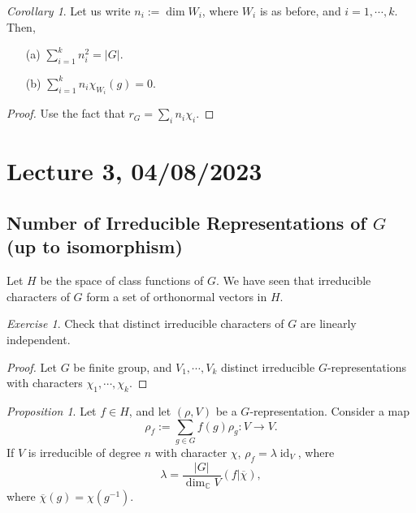 \documentclass[a4paper]{report}
\theoremstyle{definition}
\theoremstyle{remark}
\theoremstyle{proposition}
\newtheorem{proposition}{Proposition}
\theoremstyle{conjecture}
\theoremstyle{lemma}
\theoremstyle{corollary}
\newtheorem{corollary}{Corollary}
\theoremstyle{exercise}
\newtheorem{exercise}{Exercise}
\theoremstyle{example}
\newcommand{\C}{\mathbb{C}}
\newcommand{\on}{\operatorname}
\begin{document}
\begin{corollary}
    Let us write $n_i:= \dim W_i$, where $W_i$ is as before, and 
    $i=1,\cdots, k$. Then, 
    \begin{itemize}
        \item[(a)] $\sum_{i=1}^k n_i^2 = \vert G \vert$.
        \item[(b)] $\sum_{i=1}^k n_i\chi_{W_i}(g) = 0$.
    \end{itemize}
\end{corollary}
\begin{proof}
    Use the fact that $r_G = \sum_i n_i\chi_i$. 
\end{proof}

\section{Lecture 3, 04/08/2023}

\subsection{Number of Irreducible Representations of $G$ (up to isomorphism)}

Let $H$ be the space of class functions of $G$. We have seen that irreducible
characters of $G$ form a set of orthonormal vectors in $H$.

\begin{exercise}
    Check that distinct irreducible characters of $G$ are linearly 
    independent.
\end{exercise}

\begin{proof}
    Let $G$ be finite group, and $V_1,\cdots, V_k$ distinct irreducible 
    $G$-representations with characters $\chi_1,\cdots,\chi_k$.
\end{proof}

\begin{proposition}\label{prop3}
    Let $f\in H$, and let $(\rho,V)$ be a $G$-representation.
    Consider a map $$\rho_f := \sum_{g\in G} f(g)\rho_g :V \longrightarrow V.$$
    If $V$ is irreducible of degree $n$ with character $\chi$, 
    $\rho_f = \lambda \on{id}_V$, where $$\lambda = \frac{\vert G\vert}{\dim_\C V} (f\vert\overline{\chi}),$$ where $\overline{\chi}(g) = \chi(g^{-1})$.
\end{proposition}
\end{document}
